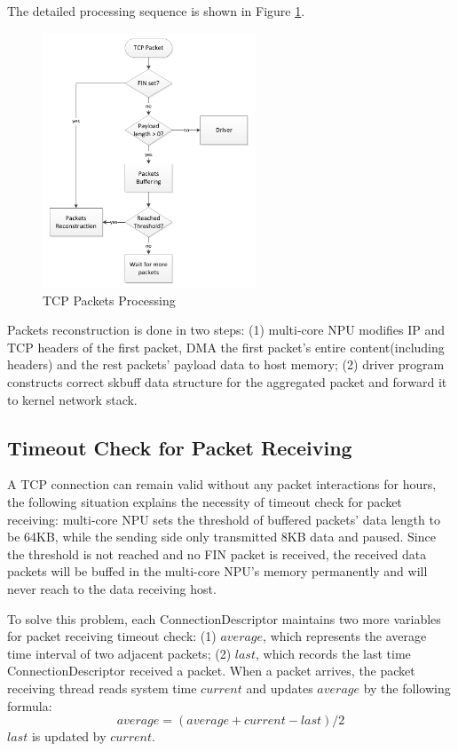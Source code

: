 \documentclass[conference]{IEEEtran}
\begin{document}
The detailed processing sequence is shown in Figure \ref{tcp packets processing}.
\begin{figure}[!t]
\centering
\includegraphics[width=2.5in]{tcp_packets_processing}
\caption{TCP Packets Processing}
\label{tcp packets processing}
\end{figure}
Packets reconstruction is done in two steps: (1) multi-core NPU modifies IP and TCP headers of the first packet, DMA the first packet's entire content(including headers) and the rest packets' payload data to host memory; (2) driver program constructs correct skbuff data structure for the aggregated packet and forward it to kernel network stack.
\subsection{Timeout Check for Packet Receiving}
A TCP connection can remain valid without any packet interactions for hours, the following situation explains the necessity of timeout check for packet receiving: multi-core NPU sets the threshold of buffered packets' data length to be 64KB, while the sending side only transmitted 8KB data and paused. Since the threshold is not reached and no FIN packet is received, the received data packets will be buffed in the multi-core NPU's memory permanently and will never reach to the data receiving host.

To solve this problem, each ConnectionDescriptor maintains two more variables for packet receiving timeout check: (1) $average$, which represents the average time interval of two adjacent packets; (2) $last$, which records the last time ConnectionDescriptor received a packet. When a packet arrives, the packet receiving thread reads system time $current$ and updates $average$ by the following formula:
\begin{equation}
average = (average + current - last) / 2
\end{equation}
$last$ is updated by $current$.
\end{document}
